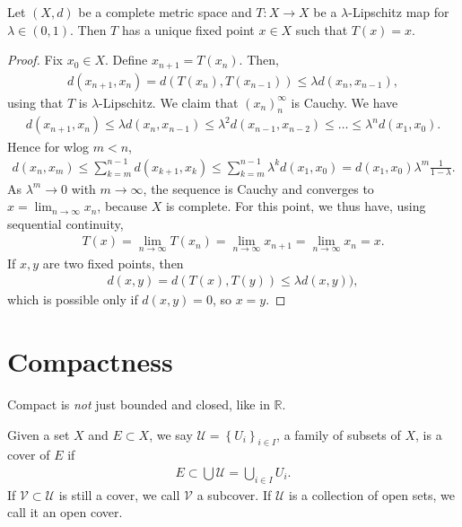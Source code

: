 \begin{theorem}\label{thm:banach_fixed_point}
	Let $(X,d)$ be a complete metric space and $T: X \to X$ be a $\lambda$-Lipschitz map for $\lambda \in (0,1)$. Then $T$ has a unique fixed point $x \in X$ such that $T(x) = x$.
\end{theorem}
\begin{proof}
	Fix $x_{0} \in X$. Define $x_{n+1} = T(x_{n})$. Then,
	\begin{align*}
		d(x_{n+1}, x_{n}) = d(T(x_{n}), T(x_{n-1})) \leq \lambda d(x_{n}, x_{n-1}),
	\end{align*}
	using that $T$ is $\lambda$-Lipschitz. We claim that $(x_{n})_{n}^{\infty}$ is Cauchy. We have
	\begin{align*}
		d(x_{n+1}, x_{n}) \leq \lambda d(x_{n}, x_{n-1}) \leq \lambda^{2} d(x_{n-1}, x_{n-2}) \leq \dots \leq \lambda^{n} d(x_{1}, x_{0}).
	\end{align*}
	Hence for wlog $m < n$,
	\begin{align*}
		d(x_{n}, x_{m}) \leq \sum_{k=m}^{n-1} d(x_{k+1}, x_{k}) \leq \sum_{k=m}^{n-1} \lambda^{k} d(x_{1}, x_{0}) = d(x_{1}, x_{0}) \lambda^{m} \frac{1}{1-\lambda}.
	\end{align*}
	As $\lambda^{m} \to 0$ with $m \to \infty$, the sequence is Cauchy and converges to $x = \lim_{n \to \infty} x_{n}$, because $X$ is complete. For this point, we thus have, using sequential continuity,
	\begin{align*}
		T(x) = \lim_{n \to \infty} T(x_{n}) = \lim_{n \to \infty} x_{n+1} = \lim_{n \to \infty} x_{n} = x.
	\end{align*}
	If $x,y$ are two fixed points, then
	\begin{align*}
		d(x, y) = d(T(x), T(y)) \leq \lambda d(x,y)),
	\end{align*}
	which is possible only if $d(x,y) = 0$, so $x = y$.
\end{proof}

\section{Compactness}

Compact is \textit{not} just bounded and closed, like in $\mathbb{R}$.

\begin{definition}\label{def:cover}
	Given a set $X$ and $E \subset X$, we say $\mathcal{U} = \left\{ U_{i} \right\}_{i \in I}$, a family of subsets of $X$, is a cover of $E$ if
	\begin{align*}
		E \subset \bigcup \mathcal{U} = \bigcup_{i \in I} U_{i}.
	\end{align*}
	If $\mathcal{V} \subset \mathcal{U}$ is still a cover, we call $\mathcal{V}$ a subcover.
	If $\mathcal{U}$ is a collection of open sets, we call it an open cover.
\end{definition}

